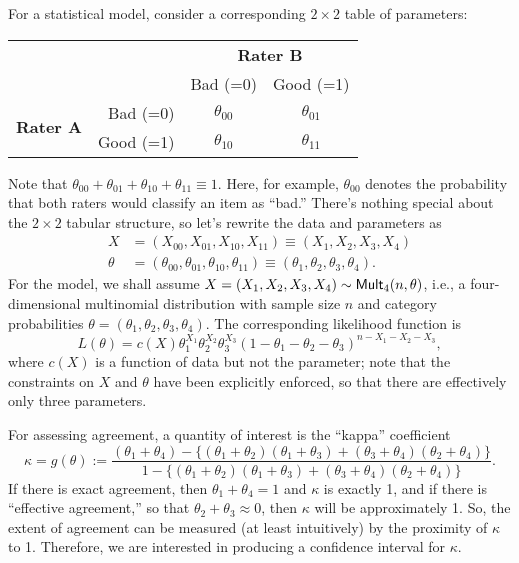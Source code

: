 \documentclass[a4paper,12pt]{article}
\begin{document}
For a statistical model, consider a corresponding $2 \times 2$ table of parameters:
\begin{center}
\begin{tabular}{ cr|c|c| }
\multicolumn{2}{r}{} & \multicolumn{2}{c}{{\bf Rater B}} \\
\multicolumn{2}{r}{} & \multicolumn{1}{c}{Bad (=0)} & \multicolumn{1}{c}{Good (=1)} \\
\cline{3-4}
\multirow{2}{*}{{\bf Rater A}} 
& Bad (=0) & $\theta_{00}$ & $\theta_{01}$ \\
\cline{3-4}
& Good (=1) & $\theta_{10}$ & $\theta_{11}$ \\
\cline{3-4}
\end{tabular}
\end{center}
Note that $\theta_{00} + \theta_{01} + \theta_{10} + \theta_{11} \equiv 1$.  Here, for example, $\theta_{00}$ denotes the probability that both raters would classify an item as ``bad.''  There's nothing special about the $2 \times 2$ tabular structure, so let's rewrite the data and parameters as 
\begin{align*}
X & = (X_{00}, X_{01}, X_{10}, X_{11}) \equiv (X_1, X_2, X_3, X_4) \\
\theta & =(\theta_{00}, \theta_{01}, \theta_{10}, \theta_{11}) \equiv (\theta_1, \theta_2, \theta_3, \theta_4).
\end{align*}
For the model, we shall assume $X =(X_1,X_2,X_3,X_4) \sim {\sf Mult}_4(n, \theta)$, i.e., a four-dimensional multinomial distribution with sample size $n$ and category probabilities $\theta=(\theta_1,\theta_2,\theta_3,\theta_4)$.  The corresponding likelihood function is 
\[ L(\theta) = c(X) \theta_1^{X_1} \theta_2^{X_2} \theta_3^{X_3} (1-\theta_1-\theta_2-\theta_3)^{n-X_1-X_2-X_3}, \]
where $c(X)$ is a function of data but not the parameter; note that the constraints on $X$ and $\theta$ have been explicitly enforced, so that there are effectively only three parameters.  

For assessing agreement, a quantity of interest is the ``kappa'' coefficient
\[ \kappa = g(\theta) := \frac{(\theta_1 + \theta_4) - \{(\theta_1 + \theta_2)(\theta_1 + \theta_3) + (\theta_3 + \theta_4)(\theta_2 + \theta_4)\}}{1 - \{(\theta_1 + \theta_2)(\theta_1 + \theta_3) + (\theta_3 + \theta_4)(\theta_2 + \theta_4)\}}. \]
If there is exact agreement, then $\theta_1 + \theta_4=1$ and $\kappa$ is exactly 1, and if there is ``effective agreement,'' so that $\theta_2+\theta_3 \approx 0$, then $\kappa$ will be approximately 1.  So, the extent of agreement can be measured (at least intuitively) by the proximity of $\kappa$ to 1.  Therefore, we are interested in producing a confidence interval for $\kappa$.    
\end{document}
